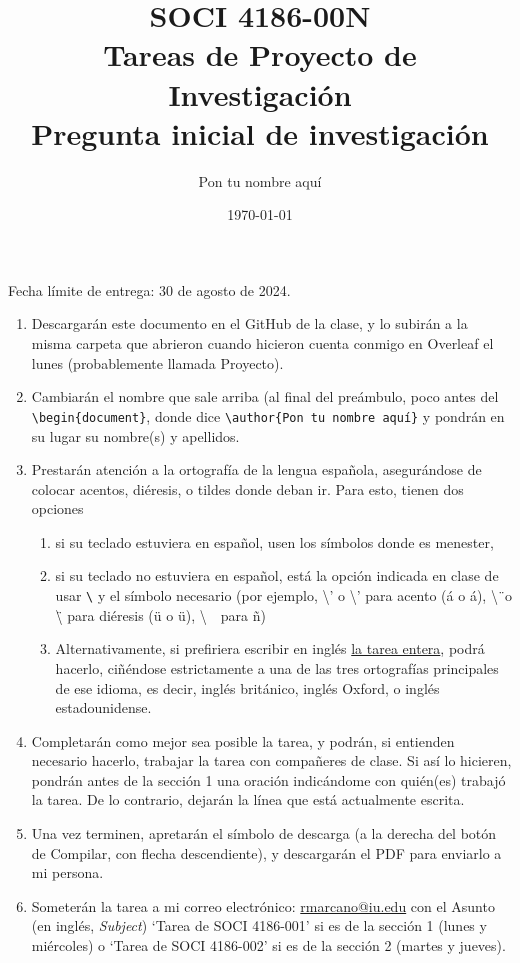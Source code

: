\documentclass[11pt]{article}
\title{SOCI 4186-00N\\ Tareas de Proyecto de Investigación \textnumero 1 \\ Pregunta inicial de investigación}
\author{Pon tu nombre aquí}
\date{\today}
\begin{document}
\singlespacing
\maketitle
\onehalfspacing
Fecha límite de entrega: 30 de agosto de 2024.

\begin{enumerate}
    \item Descargarán este documento en el GitHub de la clase, y lo subirán a la misma carpeta que abrieron cuando hicieron cuenta conmigo en Overleaf el lunes (probablemente llamada Proyecto).
    \item Cambiarán el nombre que sale arriba (al final del preámbulo, poco antes del \texttt{\textbackslash begin\{document\}}, donde dice \texttt{\textbackslash author\{Pon tu nombre aquí\}} y pondrán en su lugar su nombre(s) y apellidos.
    \item Prestarán atención a la ortografía de la lengua española, asegurándose de colocar acentos, diéresis, o tildes donde deban ir. Para esto, tienen dos opciones 
    \begin{enumerate}
        \item si su teclado estuviera en español, usen los símbolos donde es menester,
        \item si su teclado no estuviera en español, está la opción indicada en clase de usar \texttt{\textbackslash} y el símbolo necesario (por ejemplo, \textbackslash' o \textbackslash'{} para acento (\'a o \'{a}), \textbackslash\"\ o \textbackslash\"{} para diéresis (\"u o \"{u}), \textbackslash~\ para \~n)
        \item Alternativamente, si prefiriera escribir en inglés \underline{la tarea entera}, podrá hacerlo, ciñéndose estrictamente a una de las tres ortografías principales de ese idioma, es decir, inglés británico, inglés Oxford, o inglés estadounidense.
    \end{enumerate}
    \item Completarán como mejor sea posible la tarea, y podrán, si entienden necesario hacerlo, trabajar la tarea con compañeres de clase. Si así lo hicieren, pondrán antes de la sección 1 una oración indicándome con quién(es) trabajó la tarea. De lo contrario, dejarán la línea que está actualmente escrita.
    \item  Una vez terminen, apretarán el símbolo de descarga (a la derecha del botón de Compilar, con flecha descendiente), y descargarán el PDF para enviarlo a mi persona.
    \item Someterán la tarea a mi correo electrónico: \href{mailto:rmarcano@iu.edu}{rmarcano@iu.edu} con el Asunto (en inglés, \textit{Subject}) `Tarea de SOCI 4186-001' si es de la sección 1 (lunes y miércoles) o `Tarea de SOCI 4186-002' si es de la sección 2 (martes y jueves).
\end{enumerate}
\end{document}
